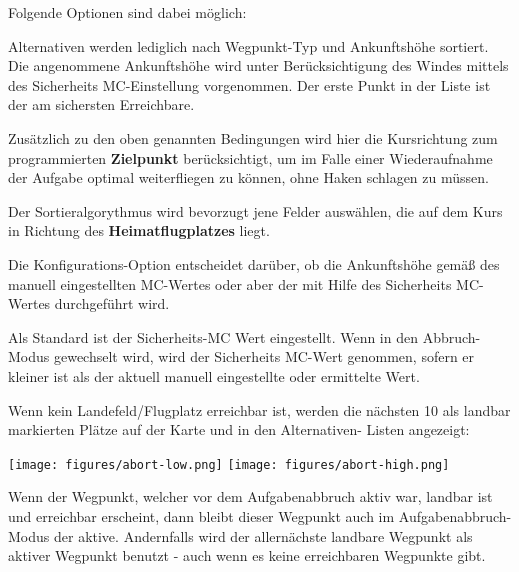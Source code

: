 Folgende Optionen sind dabei möglich:
\begin{description}
\item[\p{Einfach}] Alternativen werden lediglich nach Wegpunkt-Typ und Ankunftshöhe sortiert.
Die angenommene Ankunftshöhe wird unter Berücksichtigung des Windes mittels des Sicherheits  MC-Einstellung vorgenommen.
Der erste Punkt in der Liste  ist der am sichersten Erreichbare.
\item[\p{Aufgabe}] Zusätzlich zu den oben genannten Bedingungen wird hier die Kursrichtung zum programmierten \textbf{Zielpunkt} berücksichtigt, um im Falle einer
Wiederaufnahme der Aufgabe optimal weiterfliegen zu können, ohne Haken schlagen zu müssen.
\item[\p{Heimat}] Der Sortieralgorythmus wird bevorzugt jene Felder auswählen, die auf dem Kurs in Richtung des \textbf{Heimatflugplatzes} liegt.
\end{description}

Die Konfigurations-Option  entscheidet darüber,
ob die Ankunftshöhe gemäß des manuell eingestellten MC-Wertes oder aber der mit Hilfe des Sicherheits MC-Wertes durchgeführt wird.

Als Standard ist der Sicherheits-MC Wert eingestellt. 
Wenn in den Abbruch-Modus gewechselt wird, wird der Sicherheits MC-Wert genommen, sofern er kleiner ist als der aktuell
manuell eingestellte oder ermittelte Wert.

Wenn kein Landefeld/Flugplatz erreichbar ist, werden die nächsten 10 als landbar markierten Plätze auf der Karte und in den Alternativen- Listen angezeigt:

\begin{center}
\texttt{[image: figures/abort-low.png]}
\quad
\texttt{[image: figures/abort-high.png]}
\end{center}

Wenn der Wegpunkt, welcher vor dem Aufgabenabbruch aktiv war, landbar ist und erreichbar erscheint,
dann bleibt dieser Wegpunkt auch im Aufgabenabbruch-Modus der aktive.
Andernfalls wird der allernächste landbare  Wegpunkt als aktiver Wegpunkt benutzt - auch wenn es
keine erreichbaren Wegpunkte gibt.

